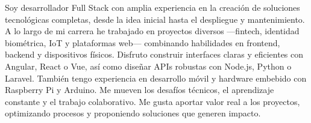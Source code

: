 %
%
%
\par{
\begin{spacing}{1.25}Soy desarrollador Full Stack con amplia experiencia en la creación de soluciones tecnológicas completas, desde la idea inicial hasta el despliegue y mantenimiento. A lo largo de mi carrera he trabajado en proyectos diversos —fintech, identidad biométrica, IoT y plataformas web— combinando habilidades en frontend, backend y dispositivos físicos. Disfruto construir interfaces claras y eficientes con Angular, React o Vue, así como diseñar APIs robustas con Node.js, Python o Laravel. También tengo experiencia en desarrollo móvil y hardware embebido con Raspberry Pi y Arduino. Me mueven los desafíos técnicos, el aprendizaje constante y el trabajo colaborativo. Me gusta aportar valor real a los proyectos, optimizando procesos y proponiendo soluciones que generen impacto.\end{spacing}
}